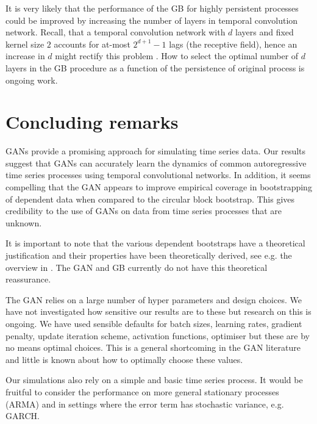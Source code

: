 \documentclass[12pt]{article}
\begin{document}
It is very likely that the performance of the GB for highly persistent processes could be improved by increasing the number of layers in temporal convolution network. Recall, that a temporal convolution network with $d$ layers and fixed kernel size $2$ accounts for at-most $2^{d+1}-1$ lags (the receptive field), hence an increase in $d$ might rectify this problem . How to select the optimal number of $d$ layers in the GB procedure as a function of the persistence of original process is ongoing work.

\section{Concluding remarks}\label{sec:conclusion}
GANs provide a promising approach for simulating time series data. Our results suggest that GANs can accurately learn the dynamics of common autoregressive time series processes using temporal convolutional networks. In addition, it seems compelling that the GAN appears to improve empirical coverage in bootstrapping of dependent data when compared to the circular block bootstrap. This gives credibility to the use of GANs on data from time series processes that are unknown.

It is important to note that the various dependent bootstraps have a theoretical justification and their properties have been theoretically derived, see e.g. the overview in \citep{lahiri1999theoretical}. The GAN and GB currently do not have this theoretical reassurance.

The GAN relies on a large number of hyper parameters and design choices. We have not investigated how sensitive our results are to these but research on this is ongoing. We have used sensible defaults for batch sizes, learning rates, gradient penalty, update iteration scheme, activation functions, optimiser but these are by no means optimal choices. This is a general shortcoming in the GAN literature and little is known about how to optimally choose these values.

Our simulations also rely on a simple and basic time series process. It would be fruitful to consider the performance on more general stationary processes (ARMA) and in settings where the error term has stochastic variance, e.g. GARCH.

\newpage
\singlespacing
\printbibliography
\newpage
\doublespacing
\end{document}
